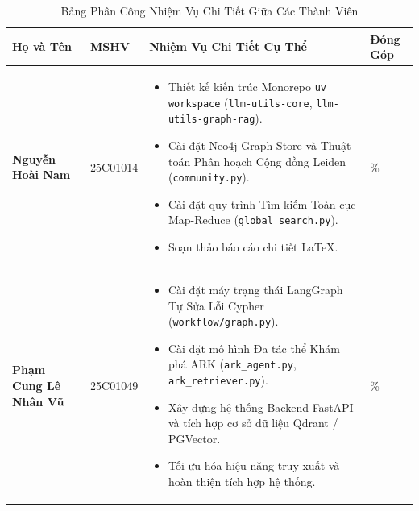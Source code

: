 \documentclass[11pt,a4paper]{report}
\begin{document}
\begin{table}[h!]
\centering
\caption{Bảng Phân Công Nhiệm Vụ Chi Tiết Giữa Các Thành Viên}
\label{tab:task_division}
\small
\begin{tabularx}{\textwidth}{>{\raggedright\arraybackslash}p{3.8cm} >{\centering\arraybackslash}p{2.2cm} X >{\centering\arraybackslash}p{1.8cm}}
\toprule
\textbf{Họ và Tên} & \textbf{MSHV} & \textbf{Nhiệm Vụ Chi Tiết Cụ Thể} & \textbf{Đóng Góp} \\
\midrule
\textbf{Nguyễn Hoài Nam} & 25C01014 &
\begin{itemize}[leftmargin=*,noitemsep,topsep=0pt,partopsep=0pt,parsep=0pt]
\item Thiết kế kiến trúc Monorepo \texttt{uv workspace} (\texttt{llm-utils-core}, \texttt{llm-utils-graph-rag}).
\item Cài đặt Neo4j Graph Store và Thuật toán Phân hoạch Cộng đồng Leiden (\texttt{community.py}).
\item Cài đặt quy trình Tìm kiếm Toàn cục Map-Reduce (\texttt{global\_search.py}).
\item Soạn thảo báo cáo chi tiết LaTeX.
\end{itemize} & 50\% \\[0.2cm]
\midrule
\textbf{Phạm Cung Lê Nhân Vũ} & 25C01049 &
\begin{itemize}[leftmargin=*,noitemsep,topsep=0pt,partopsep=0pt,parsep=0pt]
\item Cài đặt máy trạng thái LangGraph Tự Sửa Lỗi Cypher (\texttt{workflow/graph.py}).
\item Cài đặt mô hình Đa tác thể Khám phá ARK (\texttt{ark\_agent.py}, \texttt{ark\_retriever.py}).
\item Xây dựng hệ thống Backend FastAPI và tích hợp cơ sở dữ liệu Qdrant / PGVector.
\item Tối ưu hóa hiệu năng truy xuất và hoàn thiện tích hợp hệ thống.
\end{itemize} & 50\% \\
\bottomrule
\end{tabularx}
\end{table}

\newpage
{}


\end{document}
